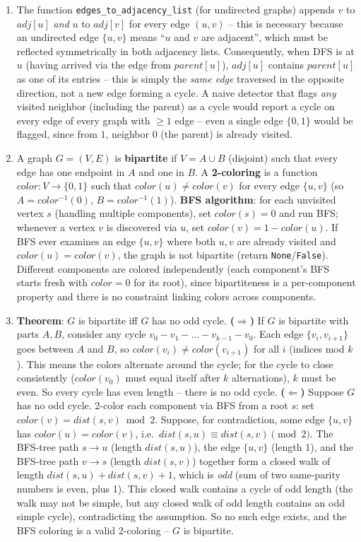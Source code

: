 \documentclass[11pt]{article}
\begin{document}
\begin{enumerate}[label=\textbf{A\arabic*.}, leftmargin=2.2em]
\item The function \texttt{edges\_to\_adjacency\_list} (for undirected graphs) appends
$v$ to $adj[u]$ \emph{and} $u$ to $adj[v]$ for every edge $(u,v)$ -- this is necessary
because an undirected edge $\{u,v\}$ means ``$u$ and $v$ are adjacent'', which must be
reflected symmetrically in both adjacency lists. Consequently, when DFS is at $u$ (having
arrived via the edge from $parent[u]$), $adj[u]$ contains $parent[u]$ as one of its
entries -- this is simply the \emph{same edge} traversed in the opposite direction, not a
new edge forming a cycle. A naive detector that flags \emph{any} visited neighbor
(including the parent) as a cycle would report a cycle on every edge of every graph with
$\ge 1$ edge -- even a single edge $\{0,1\}$ would be flagged, since from $1$, neighbor
$0$ (the parent) is already visited.

\item A graph $G=(V,E)$ is \textbf{bipartite} if $V = A \cup B$ (disjoint) such that every
edge has one endpoint in $A$ and one in $B$. A \textbf{2-coloring} is a function
$color: V \to \{0,1\}$ such that $color(u) \ne color(v)$ for every edge $\{u,v\}$ (so
$A = color^{-1}(0)$, $B = color^{-1}(1)$). \textbf{BFS algorithm}: for each unvisited
vertex $s$ (handling multiple components), set $color(s)=0$ and run BFS; whenever a
vertex $v$ is discovered via $u$, set $color(v) = 1 - color(u)$. If BFS ever examines an
edge $\{u,v\}$ where both $u,v$ are already visited and $color(u)=color(v)$, the graph is
not bipartite (return \texttt{None}/\texttt{False}). Different components are colored
independently (each component's BFS starts fresh with $color=0$ for its root), since
bipartiteness is a per-component property and there is no constraint linking colors
across components.

\item \textbf{Theorem}: $G$ is bipartite iff $G$ has no odd cycle.
\textbf{($\Rightarrow$)} If $G$ is bipartite with parts $A,B$, consider any cycle $v_0 - v_1
- \dots - v_{k-1} - v_0$. Each edge $\{v_i, v_{i+1}\}$ goes between $A$ and $B$, so
$color(v_i) \ne color(v_{i+1})$ for all $i$ (indices mod $k$). This means the colors
alternate around the cycle; for the cycle to close consistently ($color(v_0)$ must equal
itself after $k$ alternations), $k$ must be even. So every cycle has even length -- there
is no odd cycle. \textbf{($\Leftarrow$)} Suppose $G$ has no odd cycle. 2-color each
component via BFS from a root $s$: set $color(v) = dist(s,v) \bmod 2$. Suppose, for
contradiction, some edge $\{u,v\}$ has $color(u)=color(v)$, i.e.\ $dist(s,u) \equiv
dist(s,v) \pmod 2$. The BFS-tree path $s \to u$ (length $dist(s,u)$), the edge $\{u,v\}$
(length 1), and the BFS-tree path $v \to s$ (length $dist(s,v)$) together form a closed
walk of length $dist(s,u)+dist(s,v)+1$, which is \emph{odd} (sum of two same-parity
numbers is even, plus 1). This closed walk contains a cycle of odd length (the walk may
not be simple, but any closed walk of odd length contains an odd simple cycle), contradicting
the assumption. So no such edge exists, and the BFS coloring is a valid 2-coloring -- $G$
is bipartite.


\end{enumerate}
\end{document}
